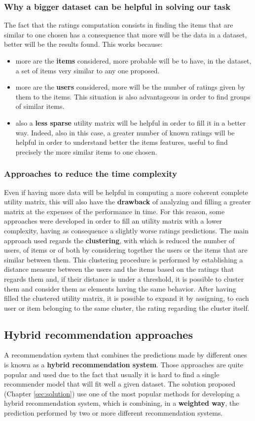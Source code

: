 \subsubsection{Why a bigger dataset can be helpful in solving our task}
The fact that the ratings computation consists in finding the items that are similar to one chosen has a consequence that more will be the data in a dataset, better will be the results found. This works because:
\begin{itemize}
    \item more are the \textbf{items} considered, more probable will be to have, in the dataset, a set of items very similar to any one proposed.
    \item more are the \textbf{users} considered, more will be the number of ratings given by them to the items. This situation is also advantageous in order to find groups of similar items.
    \item also a \textbf{less sparse} utility matrix will be helpful in order to fill it in a better way. Indeed, also in this case, a greater number of known ratings will be helpful in order to understand better the items features, useful to find precisely the more similar items to one chosen.
\end{itemize}
\subsubsection{Approaches to reduce the time complexity}
Even if having more data will be helpful in computing a more coherent complete utility matrix, this will also have the \textbf{drawback} of analyzing and filling a greater matrix at the expenses of the performance in time. For this reason, some approaches were developed in order to fill an utility matrix with a lower complexity, having as consequence a slightly worse ratings predictions. 
The main approach used regards the \textbf{clustering}, with which is reduced the number of users, of items or of both by considering together the users or the items that are similar between them. This clustering procedure is performed by establishing a distance measure between the users and the items based on the ratings that regards them and, if their distance is under a threshold, it is possible to cluster them and consider them as elements having the same behavior. After having filled the clustered utility matrix, it is possible to expand it by assigning, to each user or item belonging to the same cluster, the rating regarding the cluster itself.
\subsection{Hybrid recommendation approaches}
A recommendation system that combines the predictions made by different ones is known as a \textbf{hybrid recommendation system}. Those approaches are quite popular and used due to the fact that usually it is hard to find a single recommender model that will fit well a given dataset. The solution proposed (Chapter \ref{sec:solution}) use one of the most popular methods for developing a hybrid recommendation system, which is combining, in a \textbf{weighted way}, the prediction performed by two or more different recommendation systems.


